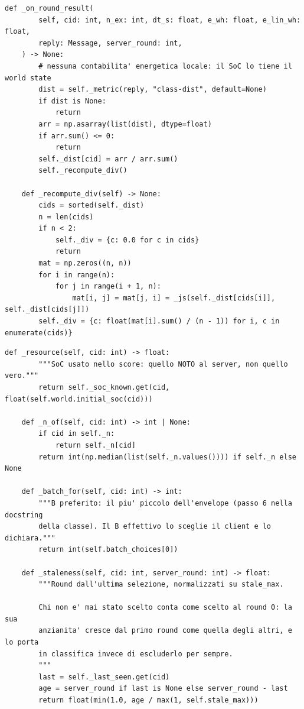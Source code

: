 \documentclass[11pt,a4paper]{article}
\begin{document}
\begin{lstlisting}[style=py,firstnumber=140,caption={\texttt{tesifl/strategies/sage\_ablation.py}, lines 140--164}]
    def _on_round_result(
        self, cid: int, n_ex: int, dt_s: float, e_wh: float, e_lin_wh: float,
        reply: Message, server_round: int,
    ) -> None:
        # nessuna contabilita' energetica locale: il SoC lo tiene il world state
        dist = self._metric(reply, "class-dist", default=None)
        if dist is None:
            return
        arr = np.asarray(list(dist), dtype=float)
        if arr.sum() <= 0:
            return
        self._dist[cid] = arr / arr.sum()
        self._recompute_div()

    def _recompute_div(self) -> None:
        cids = sorted(self._dist)
        n = len(cids)
        if n < 2:
            self._div = {c: 0.0 for c in cids}
            return
        mat = np.zeros((n, n))
        for i in range(n):
            for j in range(i + 1, n):
                mat[i, j] = mat[j, i] = _js(self._dist[cids[i]], self._dist[cids[j]])
        self._div = {c: float(mat[i].sum() / (n - 1)) for i, c in enumerate(cids)}
\end{lstlisting}

\begin{lstlisting}[style=py,firstnumber=527,caption={\texttt{tesifl/strategies/sage\_smart.py}, lines 527--550}]
    def _resource(self, cid: int) -> float:
        """SoC usato nello score: quello NOTO al server, non quello vero."""
        return self._soc_known.get(cid, float(self.world.initial_soc(cid)))

    def _n_of(self, cid: int) -> int | None:
        if cid in self._n:
            return self._n[cid]
        return int(np.median(list(self._n.values()))) if self._n else None

    def _batch_for(self, cid: int) -> int:
        """B preferito: il piu' piccolo dell'envelope (passo 6 nella docstring
        della classe). Il B effettivo lo sceglie il client e lo dichiara."""
        return int(self.batch_choices[0])

    def _staleness(self, cid: int, server_round: int) -> float:
        """Round dall'ultima selezione, normalizzati su stale_max.

        Chi non e' mai stato scelto conta come scelto al round 0: la sua
        anzianita' cresce dal primo round come quella degli altri, e lo porta
        in classifica invece di escluderlo per sempre.
        """
        last = self._last_seen.get(cid)
        age = server_round if last is None else server_round - last
        return float(min(1.0, age / max(1, self.stale_max)))
\end{lstlisting}
\end{document}
